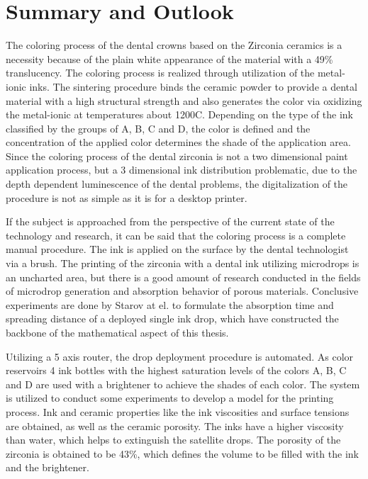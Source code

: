 \cleardoublepage
{}


\chapter{Summary and Outlook}
The coloring process of the dental crowns based on the Zirconia ceramics is a necessity because of the plain white appearance of the material with a 49\% translucency. The coloring process is realized through utilization of the metal-ionic inks. The sintering procedure binds the ceramic powder to provide a dental material with a high structural strength and also generates the color via oxidizing the metal-ionic at temperatures about 1200\textdegree C. Depending on the type of the ink classified by the groups of A, B, C and D, the color is defined and the concentration of the applied color determines the shade of the application area. Since the coloring process of the dental zirconia is not a two dimensional paint application process, but a 3 dimensional ink distribution problematic, due to the depth dependent luminescence of the dental problems, the digitalization of the procedure is not as simple as it is for a desktop printer. 

If the subject is approached from the perspective of the current state of the technology and research, it can be said that the coloring process is a complete manual procedure. The ink is applied on the surface by the dental technologist via a brush. The printing of the zirconia with a dental ink utilizing microdrops is an uncharted area, but there is a good amount of research conducted in the fields of microdrop generation and absorption behavior of porous materials. Conclusive experiments are done by Starov at el. to formulate the absorption time and spreading distance of a deployed single ink drop, which have constructed the backbone of the mathematical aspect of this thesis.

Utilizing a 5 axis router, the drop deployment procedure is automated. As color reservoirs 4 ink bottles with the highest saturation levels of the colors A, B, C and D are used with a brightener to achieve the shades of each color. The system is utilized to conduct some experiments to develop a model for the printing process. Ink and ceramic properties like the ink viscosities and surface tensions are obtained, as well as the ceramic porosity. The inks have a higher viscosity than water, which helps to extinguish the satellite drops. The porosity of the zirconia is obtained to be 43\%, which defines the volume to be filled with the ink and the brightener.

